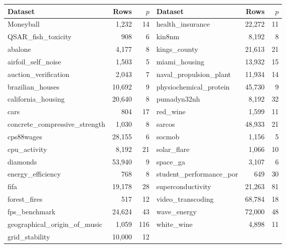 \begin{tabular}{lrr@{\qquad}lrr}
\toprule Dataset & Rows & $p$ & Dataset & Rows & $p$ \\
\midrule
Moneyball & 1,232 & 14 & health\_insurance & 22,272 & 11 \\
QSAR\_fish\_toxicity & 908 & 6 & kin8nm & 8,192 & 8 \\
abalone & 4,177 & 8 & kings\_county & 21,613 & 21 \\
airfoil\_self\_noise & 1,503 & 5 & miami\_housing & 13,932 & 15 \\
auction\_verification & 2,043 & 7 & naval\_propulsion\_plant & 11,934 & 14 \\
brazilian\_houses & 10,692 & 9 & physiochemical\_protein & 45,730 & 9 \\
california\_housing & 20,640 & 8 & pumadyn32nh & 8,192 & 32 \\
cars & 804 & 17 & red\_wine & 1,599 & 11 \\
concrete\_compressive\_strength & 1,030 & 8 & sarcos & 48,933 & 21 \\
cps88wages & 28,155 & 6 & socmob & 1,156 & 5 \\
cpu\_activity & 8,192 & 21 & solar\_flare & 1,066 & 10 \\
diamonds & 53,940 & 9 & space\_ga & 3,107 & 6 \\
energy\_efficiency & 768 & 8 & student\_performance\_por & 649 & 30 \\
fifa & 19,178 & 28 & superconductivity & 21,263 & 81 \\
forest\_fires & 517 & 12 & video\_transcoding & 68,784 & 18 \\
fps\_benchmark & 24,624 & 43 & wave\_energy & 72,000 & 48 \\
geographical\_origin\_of\_music & 1,059 & 116 & white\_wine & 4,898 & 11 \\
grid\_stability & 10,000 & 12 &  & &  \\
\bottomrule
\end{tabular}
